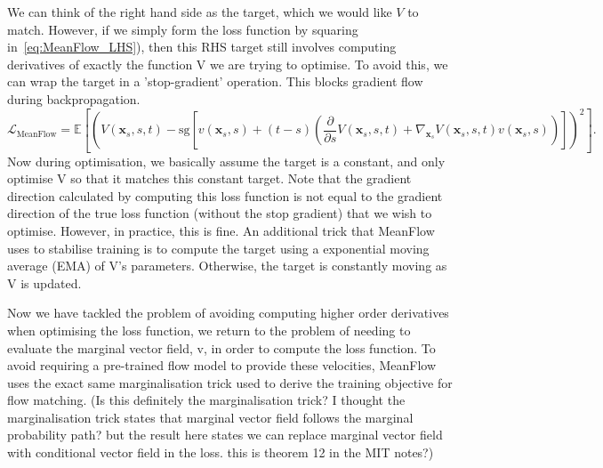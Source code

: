 \documentclass[12pt,a4paper]{report}
\begin{document}
We can think of the right hand side as the target, which we would like $V$ to match. 
However, if we simply form the loss function by squaring in~\ref{eq:MeanFlow_LHS}), then this RHS target still involves computing derivatives of exactly the function V we are trying to optimise. 
To avoid this, we can wrap the target in a 'stop-gradient' operation. 
This blocks gradient flow during backpropagation. 
\begin{equation}
\label{eq:MeanFlow_marginal}
\mathcal{L}_{\text{MeanFlow}} =
\mathbb{E} \left[ \left( V(\mathbf{x}_s, s, t) - \text{sg} \left[ v(\mathbf{x}_s, s) + (t - s) \left( \frac{\partial}{\partial s} V(\mathbf{x}_s, s, t) + \nabla_{\mathbf{x}_s} V(\mathbf{x}_s, s, t) v(\mathbf{x}_s, s) \right) \right] \right)^2 \right].
\end{equation}
Now during optimisation, we basically assume the target is a constant, and only optimise V so that it matches this constant target. 
Note that the gradient direction calculated by computing this loss function is not equal to the gradient direction of the true loss function (without the stop gradient) that we wish to optimise. 
However, in practice, this is fine. 
An additional trick that MeanFlow uses to stabilise training is to compute the target using a exponential moving average (EMA) of V's parameters. 
Otherwise, the target is constantly moving as V is updated. 

Now we have tackled the problem of avoiding computing higher order derivatives when optimising the loss function, we return to the problem of needing to evaluate the marginal vector field, v, in order to compute the loss function. 
To avoid requiring a pre-trained flow model to provide these velocities, MeanFlow uses the exact same marginalisation trick used to derive the training objective for flow matching. (Is this definitely the marginalisation trick? I thought the marginalisation trick states that marginal vector field follows the marginal probability path? but the result here states we can replace marginal vector field with conditional vector field in the loss. this is theorem 12 in the MIT notes?)
\end{document}
